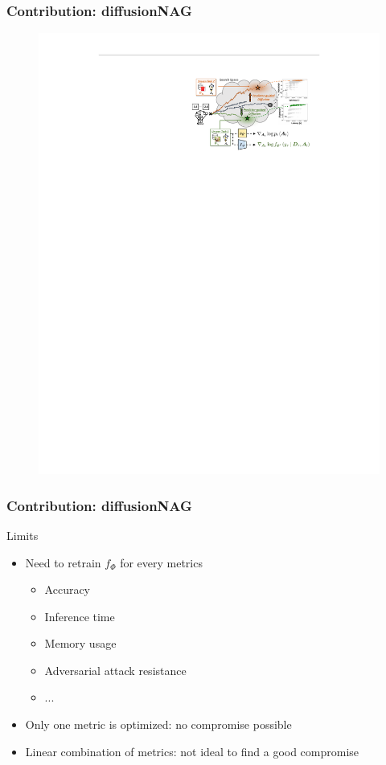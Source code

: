 \documentclass[aspectratio=169,xcolor=dvipsnames]{beamer}
\begin{document}
\begin{frame}
    \frametitle{Contribution: diffusionNAG}
    \begin{figure}[htbp]
        \centering
        \includegraphics[height=.80\textheight]{diffusionNAG_part2.pdf}
    \end{figure}
\end{frame}

\begin{frame}
    \frametitle{Contribution: diffusionNAG}
    Limits
    \begin{itemize}
        \item Need to retrain $ f_\Phi $ for every metrics
              \begin{itemize}
                  \item Accuracy
                  \item Inference time
                  \item Memory usage
                  \item Adversarial attack resistance
                  \item ...
              \end{itemize}
        \item Only one metric is optimized: no compromise possible
        \item Linear combination of metrics: not ideal to find a good compromise
    \end{itemize}
\end{frame}
\end{document}
